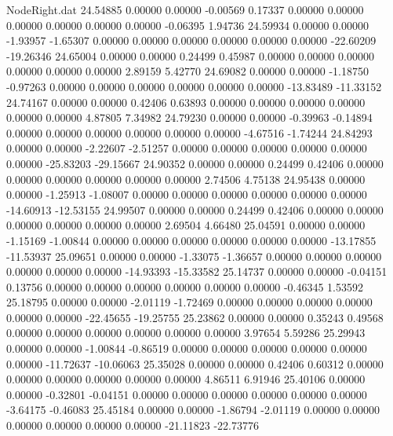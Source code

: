 \begin{filecontents}{NodeRight.dat}
  24.54885    0.00000    0.00000    -0.00569    0.17337    0.00000    0.00000    0.00000    0.00000    0.00000    0.00000   -0.06395    1.94736
  24.59934    0.00000    0.00000    -1.93957   -1.65307    0.00000    0.00000    0.00000    0.00000    0.00000    0.00000  -22.60209  -19.26346
  24.65004    0.00000    0.00000     0.24499    0.45987    0.00000    0.00000    0.00000    0.00000    0.00000    0.00000    2.89159    5.42770
  24.69082    0.00000    0.00000    -1.18750   -0.97263    0.00000    0.00000    0.00000    0.00000    0.00000    0.00000  -13.83489  -11.33152
  24.74167    0.00000    0.00000     0.42406    0.63893    0.00000    0.00000    0.00000    0.00000    0.00000    0.00000    4.87805    7.34982
  24.79230    0.00000    0.00000    -0.39963   -0.14894    0.00000    0.00000    0.00000    0.00000    0.00000    0.00000   -4.67516   -1.74244
  24.84293    0.00000    0.00000    -2.22607   -2.51257    0.00000    0.00000    0.00000    0.00000    0.00000    0.00000  -25.83203  -29.15667
  24.90352    0.00000    0.00000     0.24499    0.42406    0.00000    0.00000    0.00000    0.00000    0.00000    0.00000    2.74506    4.75138
  24.95438    0.00000    0.00000    -1.25913   -1.08007    0.00000    0.00000    0.00000    0.00000    0.00000    0.00000  -14.60913  -12.53155
  24.99507    0.00000    0.00000     0.24499    0.42406    0.00000    0.00000    0.00000    0.00000    0.00000    0.00000    2.69504    4.66480
  25.04591    0.00000    0.00000    -1.15169   -1.00844    0.00000    0.00000    0.00000    0.00000    0.00000    0.00000  -13.17855  -11.53937
  25.09651    0.00000    0.00000    -1.33075   -1.36657    0.00000    0.00000    0.00000    0.00000    0.00000    0.00000  -14.93393  -15.33582
  25.14737    0.00000    0.00000    -0.04151    0.13756    0.00000    0.00000    0.00000    0.00000    0.00000    0.00000   -0.46345    1.53592
  25.18795    0.00000    0.00000    -2.01119   -1.72469    0.00000    0.00000    0.00000    0.00000    0.00000    0.00000  -22.45655  -19.25755
  25.23862    0.00000    0.00000     0.35243    0.49568    0.00000    0.00000    0.00000    0.00000    0.00000    0.00000    3.97654    5.59286
  25.29943    0.00000    0.00000    -1.00844   -0.86519    0.00000    0.00000    0.00000    0.00000    0.00000    0.00000  -11.72637  -10.06063
  25.35028    0.00000    0.00000     0.42406    0.60312    0.00000    0.00000    0.00000    0.00000    0.00000    0.00000    4.86511    6.91946
  25.40106    0.00000    0.00000    -0.32801   -0.04151    0.00000    0.00000    0.00000    0.00000    0.00000    0.00000   -3.64175   -0.46083
  25.45184    0.00000    0.00000    -1.86794   -2.01119    0.00000    0.00000    0.00000    0.00000    0.00000    0.00000  -21.11823  -22.73776

\end{filecontents}
